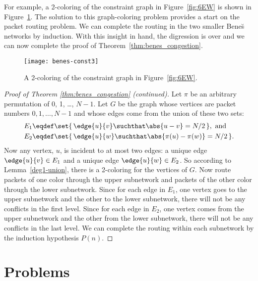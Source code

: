 For example, a 2-coloring of the constraint graph in
Figure~\ref{fig:6EW} is shown in Figure~\ref{fig:6EX}.  The solution
to this graph-coloring problem provides a start on the packet routing
problem.  We can complete the routing in the two smaller Bene\u{s}
networks by induction.  With this insight in hand, the digression is
over and we can now complete the proof of
Theorem~\ref{thm:benes_congestion}.

\begin{figure}

\texttt{[image: benes-const3]}

\caption{A 2-coloring of the constraint graph in
  Figure~\ref{fig:6EW}.}

\label{fig:6EX}

\end{figure}

\begin{proof}[Proof of Theorem \ref{thm:benes_congestion}
    \textup(continued\textup)] 

Let $\pi$ be an arbitrary permutation of 0, 1, \dots, $N-1$.  Let $G$
be the graph whose vertices are packet numbers $0, 1, \dots, N-1$ and
whose edges come from the union of these two sets:
\begin{align*}
E_1 \eqdef &  \set{\, \edge{u}{v} \suchthat \abs{u - v} = N/2 \,},\ \text{and} \\
E_2 \eqdef &  \set{\, \edge{u}{w} \suchthat \abs{\pi(u) - \pi(w)} = N/2\,}.
\end{align*}
Now any vertex, $u$, is incident to at most two edges: a unique edge
$\edge{u}{v} \in E_1$ and a unique edge $\edge{u}{w} \in E_2$.  So
according to Lemma~\ref{deg1-union}, there is a 2-coloring for the
vertices of $G$.  Now route packets of one color through the upper
subnetwork and packets of the other color through the lower
subnetwork.  Since for each edge in $E_1$, one vertex goes to the
upper subnetwork and the other to the lower subnetwork, there will not
be any conflicts in the first level.  Since for each edge in $E_2$,
one vertex comes from the upper subnetwork and the other from the
lower subnetwork, there will not be any conflicts in the last level.
We can complete the routing within each subnetwork by the induction
hypothesis $P(n)$.
\end{proof}

\section{Problems}


